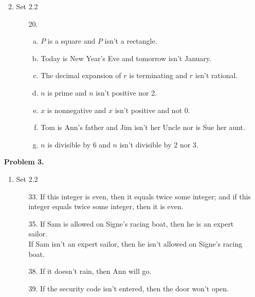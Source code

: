 \documentclass[letterpaper]{article}
\begin{document}
\begin{enumerate}
\begin{enumerate}
\begin{itemize}
			\end{itemize}
			
			\item Set 2.2
			\begin{itemize}
				\item [20.] \quad
				\begin{enumerate}[(a)]
					\item $P$ is a square and $P$ isn't a rectangle.
					\item Today is New Year's Eve and tomorrow isn't January.
					\item The decimal expansion of $r$ is terminating and $r$ isn't rational.
					\item $n$ is prime and $n$ isn't positive nor 2.
					\item $x$ is nonnegative and $x$ isn't positive and not 0.
					\item Tom is Ann's father and Jim isn't her Uncle nor is Sue her aunt.
					\item $n$ is divisible by 6 and $n$ isn't divisible by 2 nor 3.
				\end{enumerate}
			\end{itemize}
		\end{enumerate}
		
		\item [] \textbf{Problem 3.}
		\begin{enumerate}
			\item Set 2.2
			\begin{itemize}
				\item [33.] If this integer is even, then it equals twice some integer; and if this integer equals twice some integer, then it is even.
				\item [35.] 
				If Sam is allowed on Signe's racing boat, then he is an expert sailor. \\
				If Sam isn't an expert sailor, then he isn't allowed on Signe's racing boat.
				\item [38.] If it doesn't rain, then Ann will go.
				\item [39.] If the security code isn't entered, then the door won't open.
			\end{itemize}
			

\end{enumerate}
\end{enumerate}
\end{document}

